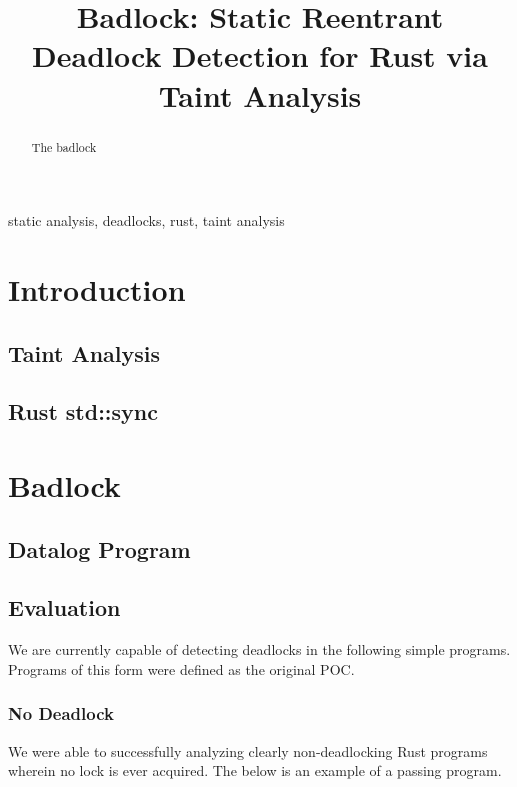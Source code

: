 \documentclass[conference]{IEEEtran}
\begin{document}
\title{Badlock: Static Reentrant Deadlock Detection for Rust via Taint Analysis}

\author{
}

\maketitle

\begin{abstract}
The badlock
\end{abstract}

\begin{IEEEkeywords}
static analysis, deadlocks, rust, taint analysis
\end{IEEEkeywords}

\section{Introduction}

\subsection{Taint Analysis}

\subsection{Rust std::sync}

\section{Badlock}

\subsection{Datalog Program}

\subsection{Evaluation}
We are currently capable of detecting deadlocks in the following simple programs. Programs of this form were defined as the original POC.

\subsubsection{No Deadlock}
We were able to successfully analyzing clearly non-deadlocking Rust programs wherein no lock is ever acquired. The below is an example of a passing program.
\end{document}
